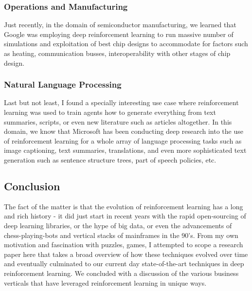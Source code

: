 \documentclass[a4paper,10pt]{extarticle}
\begin{document}
\begin{multicols}{2}
                        \subsubsection{Operations and Manufacturing}
                        Just recently, in the domain of semiconductor manufacturing, we learned that Google was employing deep reinforcement learning to run massive number of simulations and exploitation of best chip designs to accommodate for factors such as heating, communication busses, interoperability with other stages of chip design. 

                        \subsubsection{Natural Language Processing}
                        Last but not least, I found a specially interesting use case where reinforcement learning was used to train agents how to generate everything from text summaries, scripts, or even new literature such as articles altogether. In this domain, we know that Microsoft has been conducting deep research into the use of reinforcement learning for a whole array of language processing tasks such as image captioning, text summaries, translations, and even more sophisticated text generation such as sentence structure trees, part of speech policies, etc. 

                        \subsection{Conclusion}
                        The fact of the matter is that the evolution of reinforcement learning has a long and rich history - it did just start in recent years with the rapid open-sourcing of deep learning libraries, or the hype of big data, or even the advancements of chess-playing-bots and vertical stacks of mainframes in the 90's. From my own motivation and fascination with puzzles, games, I attempted to scope a research paper here that takes a broad overview of how these techniques evolved over time and eventually culminated to our current day state-of-the-art techniques in deep reinforcement learning. We concluded with a discussion of the various business verticals that have leveraged reinforcement learning in unique ways. 

                        \end{multicols}

                        
\end{document}
